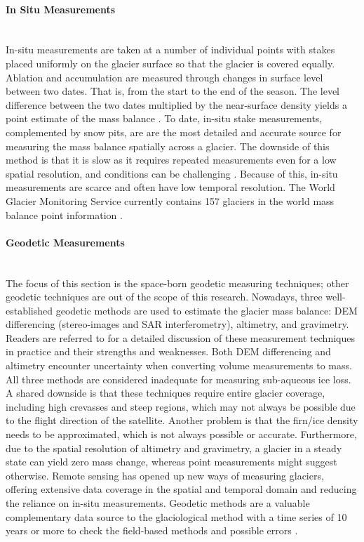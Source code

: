 \paragraph{In Situ Measurements}\mbox{} \\ 
In-situ measurements are taken at a number of individual points with stakes placed uniformly on the glacier surface so that the glacier is covered equally. Ablation and accumulation are measured through changes in surface level between two dates. That is, from the start to the end of the season. The level difference between the two dates multiplied by the near-surface density yields a point estimate of the mass balance \cite{strem-1993}. To date, in-situ stake measurements, complemented by snow pits, are are the most detailed and accurate source for measuring the mass balance spatially across a glacier. The downside of this method is that it is slow as it requires repeated measurements even for a low spatial resolution, and conditions can be challenging \cite{kaser-2003}. Because of this, in-situ measurements are scarce and often have low temporal resolution. The World Glacier Monitoring Service currently contains 157 glaciers in the world mass balance point information \cite{world-glacier-monitoring-service-2024}. 

\paragraph{Geodetic Measurements}\mbox{} \\ 
The focus of this section is the space-born geodetic measuring techniques; other geodetic techniques are out of the scope of this research. Nowadays, three well-established geodetic methods are used to estimate the glacier mass balance: DEM differencing (stereo-images and SAR interferometry), altimetry, and gravimetry. Readers are referred to \cite{berthier-2023} for a detailed discussion of these measurement techniques in practice and their strengths and weaknesses. Both DEM differencing and altimetry encounter uncertainty when converting volume measurements to mass. All three methods are considered inadequate for measuring sub-aqueous ice loss. A shared downside is that these techniques require entire glacier coverage, including high crevasses and steep regions, which may not always be possible due to the flight direction of the satellite. Another problem is that the firn/ice density needs to be approximated, which is not always possible or accurate. Furthermore, due to the spatial resolution of altimetry and gravimetry, a glacier in a steady state can yield zero mass change, whereas point measurements might suggest otherwise. Remote sensing has opened up new ways of measuring glaciers, offering extensive data coverage in the spatial and temporal domain and reducing the reliance on in-situ measurements. Geodetic methods are a valuable complementary data source to the glaciological method with a time series of 10 years or more to check the field-based methods and possible errors \cite{kaser-2003}. 


